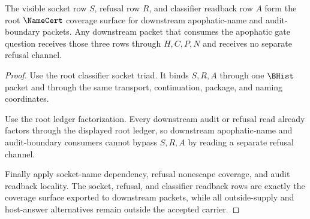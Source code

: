 \begin{theorem}
\label{thm:apophatic-gate-question-root-refusal-coverage}
The visible socket row $S$, refusal row $R$, and classifier readback row $A$ form the root $\NameCert$ coverage surface for downstream apophatic-name and audit-boundary packets. Any downstream packet that consumes the apophatic gate question receives those three rows through $H,C,P,N$ and receives no separate refusal channel.
\end{theorem}
\begin{proof}
Use the root classifier socket triad. It binds $S,R,A$ through one $\BHist$ packet and through the same transport, continuation, package, and naming coordinates.

Use the root ledger factorization. Every downstream audit or refusal read already factors through the displayed root ledger, so downstream apophatic-name and audit-boundary consumers cannot bypass $S,R,A$ by reading a separate refusal channel.

Finally apply socket-name dependency, refusal nonescape coverage, and audit readback locality. The socket, refusal, and classifier readback rows are exactly the coverage surface exported to downstream packets, while all outside-supply and host-answer alternatives remain outside the accepted carrier.
\end{proof}

